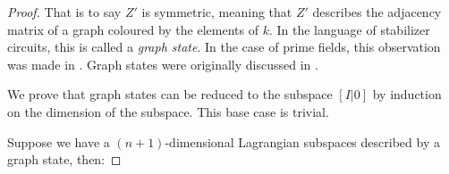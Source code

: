 \begin{proof}
That is to say $Z'$ is symmetric, meaning that $Z'$ describes the adjacency matrix of a graph coloured by the elements of $k$.
In the language of stabilizer circuits, this is called a {\em graph state}.  In the case of prime fields, this observation was made in \cite[Eq. 18]{gross}.  Graph states were originally discussed in \cite{hein2006entanglement}.


%
%
%
%
%


We prove that graph states can be reduced to the subspace $[I|0]$ by induction on the dimension of the subspace.
This base case is trivial.

Suppose we have a $(n+1)$-dimensional Lagrangian subspaces described by a graph state, then:
\newpage


\end{proof}
